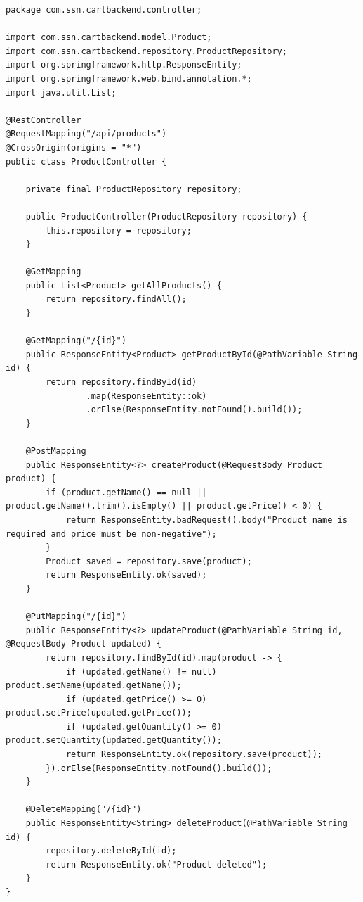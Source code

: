 \documentclass[12pt,a4paper]{article}
\begin{document}
\begin{lstlisting}[style=javastyle, caption={ProductController.java: REST Endpoints with Input Validation}]
package com.ssn.cartbackend.controller;

import com.ssn.cartbackend.model.Product;
import com.ssn.cartbackend.repository.ProductRepository;
import org.springframework.http.ResponseEntity;
import org.springframework.web.bind.annotation.*;
import java.util.List;

@RestController
@RequestMapping("/api/products")
@CrossOrigin(origins = "*")
public class ProductController {

    private final ProductRepository repository;

    public ProductController(ProductRepository repository) {
        this.repository = repository;
    }

    @GetMapping
    public List<Product> getAllProducts() {
        return repository.findAll();
    }

    @GetMapping("/{id}")
    public ResponseEntity<Product> getProductById(@PathVariable String id) {
        return repository.findById(id)
                .map(ResponseEntity::ok)
                .orElse(ResponseEntity.notFound().build());
    }

    @PostMapping
    public ResponseEntity<?> createProduct(@RequestBody Product product) {
        if (product.getName() == null || product.getName().trim().isEmpty() || product.getPrice() < 0) {
            return ResponseEntity.badRequest().body("Product name is required and price must be non-negative");
        }
        Product saved = repository.save(product);
        return ResponseEntity.ok(saved);
    }

    @PutMapping("/{id}")
    public ResponseEntity<?> updateProduct(@PathVariable String id, @RequestBody Product updated) {
        return repository.findById(id).map(product -> {
            if (updated.getName() != null) product.setName(updated.getName());
            if (updated.getPrice() >= 0) product.setPrice(updated.getPrice());
            if (updated.getQuantity() >= 0) product.setQuantity(updated.getQuantity());
            return ResponseEntity.ok(repository.save(product));
        }).orElse(ResponseEntity.notFound().build());
    }

    @DeleteMapping("/{id}")
    public ResponseEntity<String> deleteProduct(@PathVariable String id) {
        repository.deleteById(id);
        return ResponseEntity.ok("Product deleted");
    }
}
\end{lstlisting}
\end{document}
